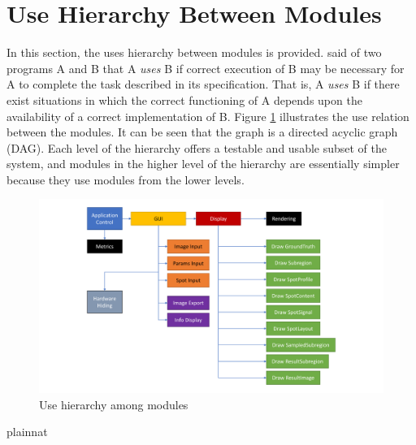 \documentclass[12pt, titlepage]{article}
\begin{document}
\section{Use Hierarchy Between Modules} \label{SecUse}

In this section, the uses hierarchy between modules is
provided. \citet{Parnas1978} said of two programs A and B that A {\em uses} B if
correct execution of B may be necessary for A to complete the task described in
its specification. That is, A {\em uses} B if there exist situations in which
the correct functioning of A depends upon the availability of a correct
implementation of B.  Figure \ref{FigUH} illustrates the use relation between
the modules. It can be seen that the graph is a directed acyclic graph
(DAG). Each level of the hierarchy offers a testable and usable subset of the
system, and modules in the higher level of the hierarchy are essentially simpler
because they use modules from the lower levels.

\begin{figure}[H]
\centering
\includegraphics[width=1.00\textwidth]{MG_graph.pdf}
\caption{Use hierarchy among modules}
\label{FigUH}
\end{figure}


 {plainnat}


\newpage{}
\end{document}
